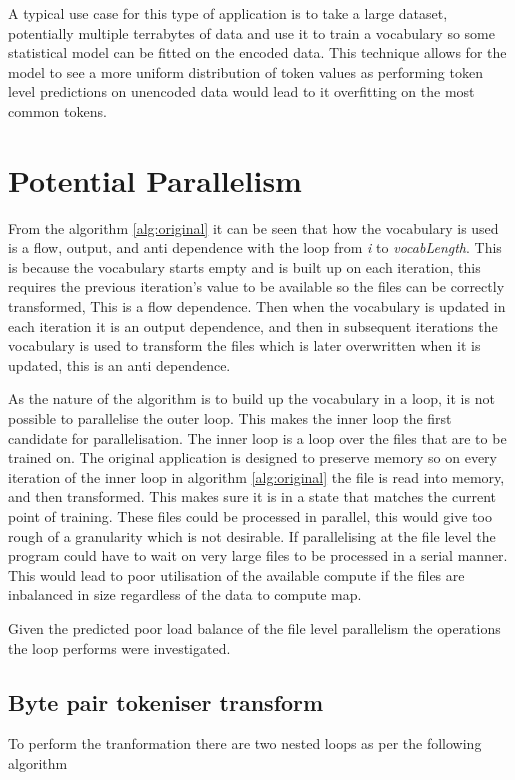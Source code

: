 \documentclass{article}
\begin{document}
A typical use case for this type of application is to take a large dataset, potentially multiple terrabytes of
data and use it to train a vocabulary so some statistical model can be fitted on the encoded data. 
This technique allows for the model to see a more uniform distribution of token values as performing
token level predictions on unencoded data would lead to it overfitting on the most common tokens.

\section{Potential Parallelism}
From the algorithm \ref{alg:original} it can be seen that how the vocabulary is used is a 
flow, output, and anti dependence with the loop from \textit{i} to \textit{vocabLength}. This is
because the vocabulary starts empty and is built up on each iteration, this requires the previous 
iteration's value to be available so the files can be correctly transformed, This is a flow dependence.
Then when the vocabulary is updated in each iteration it is an output dependence, and then in subsequent
iterations the vocabulary is used to transform the files which is later overwritten when it is updated, this is an anti dependence.

As the nature of the algorithm is to build up the vocabulary in a loop, it is not possible to parallelise the outer loop. 
This makes the inner loop the first candidate for parallelisation. The inner loop is a loop over the files that are to be trained on.
The original application is designed to preserve memory so on every iteration of the inner loop in algorithm \ref{alg:original} 
the file is read into memory, and then transformed. This makes sure it is in a state that matches the current point of training.
These files could be processed in parallel, this would give too rough of a granularity which is not desirable. 
If parallelising at the file level the program could have to wait on very large files to be processed 
in a serial manner. This would lead to poor utilisation of the available compute if the files are 
inbalanced in size regardless of the data to compute map.

Given the predicted poor load balance of the file level parallelism the operations the loop performs
were investigated. 

\subsection{Byte pair tokeniser transform}
To perform the tranformation there are two nested loops as per the following algorithm
\end{document}
